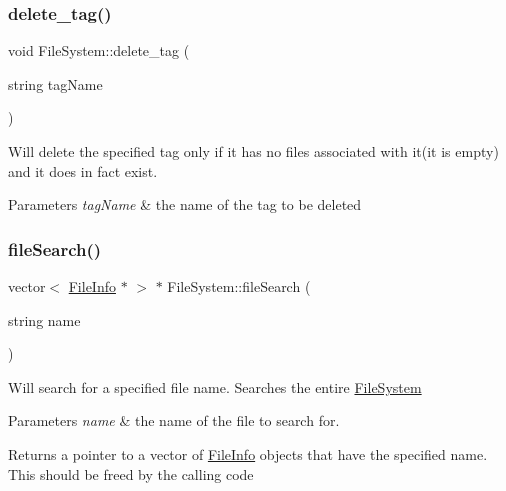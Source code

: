\subsubsection{\texorpdfstring{delete\+\_\+tag()}{delete\_tag()}}
{\footnotesize\ttfamily void File\+System\+::delete\+\_\+tag (\begin{DoxyParamCaption}\item[{string}]{tag\+Name }\end{DoxyParamCaption})}

Will delete the specified tag only if it has no files associated with it(it is empty) and it does in fact exist. 
\begin{DoxyParams}{Parameters}
{\em tag\+Name} & the name of the tag to be deleted \\
\hline
\end{DoxyParams}
\mbox{\label{classFileSystem_aaa02d1a13bb71582a2a4268d32cba5b6}} 
\subsubsection{\texorpdfstring{file\+Search()}{fileSearch()}}
{\footnotesize\ttfamily vector$<$ \mbox{\hyperlink{classFileInfo}{File\+Info}} $\ast$ $>$ $\ast$ File\+System\+::file\+Search (\begin{DoxyParamCaption}\item[{string}]{name }\end{DoxyParamCaption})}

Will search for a specified file name. Searches the entire \mbox{\hyperlink{classFileSystem}{File\+System}} 
\begin{DoxyParams}{Parameters}
{\em name} & the name of the file to search for. \\
\hline
\end{DoxyParams}
\begin{DoxyReturn}{Returns}
a pointer to a vector of \mbox{\hyperlink{classFileInfo}{File\+Info}} objects that have the specified name. This should be freed by the calling code 
\end{DoxyReturn}
\mbox{\label{classFileSystem_a32588895aea79931d4a09deb89ec2659}} 
